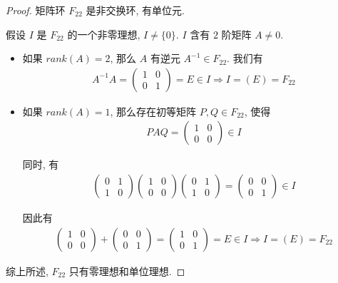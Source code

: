 \documentclass[utf8]{ctexbook}
\theoremstyle{definition}
\begin{document}
\begin{proof}
矩阵环 $F_{22}$ 是非交换环, 有单位元.

假设 $I$ 是 $F_{22}$ 的一个非零理想, $I \neq \{ 0 \}$. $I$ 含有 $2$ 阶矩阵 $A \neq 0$.
\begin{itemize}
\item{如果 $rank(A) = 2$, 那么 $A$ 有逆元 $A^{-1} \in F_{22}$. 我们有
\begin{align*}
A^{-1} A = \left(
\begin{array}{cc}
1 & 0 \\
0 & 1
\end{array}
\right)
= E \in I \Longrightarrow I = (E) = F_{22}
\end{align*}
}
\item{如果 $rank(A)=1$, 那么存在初等矩阵 $P, Q \in F_{22}$, 使得
\begin{align*}
P A Q = \left(
\begin{array}{cc}
1 & 0 \\
0 & 0
\end{array}
\right)
\in I
\end{align*}

同时, 有
\begin{align*}
\left(
\begin{array}{cc}
0 & 1 \\
1 & 0
\end{array}
\right) 
\left(
\begin{array}{cc}
1 & 0 \\
0 & 0
\end{array}
\right)
\left(
\begin{array}{cc}
0 & 1 \\
1 & 0
\end{array}
\right) = 
\left(
\begin{array}{cc}
0 & 0 \\
0 & 1
\end{array}
\right) \in I
\end{align*}

因此有
\begin{align*}
\left(
\begin{array}{cc}
1 & 0 \\
0 & 0
\end{array}
\right)
+
\left(
\begin{array}{cc}
0 & 0 \\
0 & 1
\end{array}
\right)
= 
\left(
\begin{array}{cc}
1 & 0 \\
0 & 1
\end{array}
\right)
= E \in I
\Longrightarrow I = (E) = F_{22}
\end{align*}
}
\end{itemize}
综上所述, $F_{22}$ 只有零理想和单位理想.



\end{proof}
\end{document}
